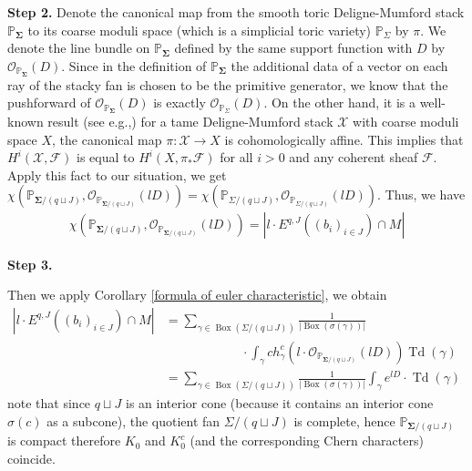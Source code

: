 \documentclass[11pt,reqno]{amsart}
\def\PP {{\mathbb P}}
\theoremstyle{definition}
\numberwithin{equation}{section}
\begin{document}
{\bf Step 2.}
Denote the canonical map from the smooth toric Deligne-Mumford stack $\PP_{\mathbf{\Sigma}}$ to its coarse moduli space (which is a simplicial toric variety) $\PP_{\Sigma}$ by $\pi$. We denote the line bundle on $\PP_{\mathbf{\Sigma}}$ defined by the same support function with $D$ by $\mathcal{O}_{\PP_{\mathbf{\Sigma}}}(D)$. Since in the definition of $\PP_{\mathbf{\Sigma}}$ the additional data of a vector on each ray of the stacky fan is chosen to be the primitive generator, we know that the pushforward of $\mathcal{O}_{\PP_{\mathbf{\Sigma}}}(D)$ is exactly $\mathcal{O}_{\PP_{\Sigma}}(D)$. On the other hand, it is a well-known result (see e.g.,\cite[Definition 4.1, Example 8.1]{stack}) for a tame Deligne-Mumford stack $\mathcal{X}$ with coarse moduli space $X$, the canonical map $\pi:\mathcal{X}\rightarrow X$ is cohomologically affine. This implies that $H^i(\mathcal{X},\mathcal{F})$ is equal to $H^i(X,\pi_*\mathcal{F})$ for all $i>0$ and any coherent sheaf $\mathcal{F}$. Apply this fact to our situation, we get $\chi(\PP_{\mathbf{\Sigma}/(q\sqcup J)},\mathcal{O}_{\PP_{\mathbf{\Sigma}/(q\sqcup J)}}(lD))=\chi(\PP_{\Sigma/(q\sqcup J)},\mathcal{O}_{\PP_{\Sigma/(q\sqcup J)}}(lD))$. Thus, we have
\begin{align*}
	\chi(\PP_{\mathbf{\Sigma}/(q\sqcup J)},\mathcal{O}_{\PP_{\mathbf{\Sigma}/(q\sqcup J)}}(lD))=|l\cdot E^{q,J}((b_i)_{i\in J})\cap M|
\end{align*}

\medskip


{\bf Step 3.}

Then we apply Corollary \ref{formula of euler characteristic}, we obtain
\begin{align*}
	|l\cdot E^{q,J}((b_i)_{i\in J})\cap M| &= \sum_{\gamma\in\operatorname{Box}(\Sigma/(q\sqcup J))}\frac{1}{|\operatorname{Box}(\sigma(\gamma))|}\\
	&\qquad\qquad\qquad \cdot\int_{\gamma}ch_{\gamma}^c(l\cdot \mathcal{O}_{\PP_{\mathbf{\Sigma}/(q\sqcup J)}}(lD))\operatorname{Td}(\gamma)\\
	&=\sum_{\gamma\in\operatorname{Box}(\Sigma/(q\sqcup J))}\frac{1}{|\operatorname{Box}(\sigma(\gamma))|}\int_{\gamma}e^{lD}\cdot \operatorname{Td}(\gamma)
\end{align*}
note that since $q\sqcup J$ is an interior cone (because it contains an interior cone $\sigma(c)$ as a subcone), the quotient fan $\Sigma/(q\sqcup J)$ is complete, hence $\PP_{\mathbf{\Sigma}/(q\sqcup J)}$ is compact therefore $K_0$ and $K_0^c$ (and the corresponding Chern characters) coincide.
\end{document}
